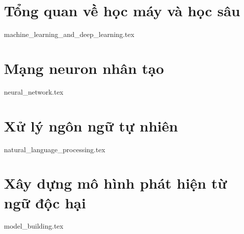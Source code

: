 \section{Tổng quan về học máy và học sâu}
{machine_learning_and_deep_learning.tex}

\section{Mạng neuron nhân tạo}
{neural_network.tex}

\section{Xử lý ngôn ngữ tự nhiên}
{natural_language_processing.tex}

\section{Xây dựng mô hình phát hiện từ ngữ độc hại}
{model_building.tex}


